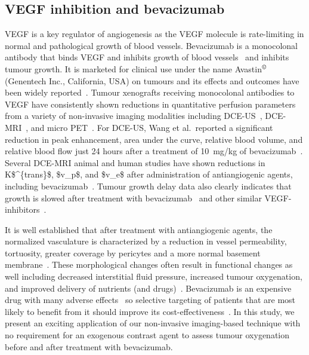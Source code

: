 \subsection{VEGF inhibition and bevacizumab}

\acs{VEGF} is a key regulator of angiogenesis as the \acs{VEGF} molecule is rate-limiting in normal and pathological growth of blood vessels.
Bevacizumab is a monocolonal antibody that binds \acs{VEGF} and inhibits growth of blood vessels~\cite{Ferrara:2004fa} and inhibits tumour growth.
It is marketed for clinical use under the name Avastin$^{\tiny{\textrm{\textcopyright}}}$ (Genentech Inc., California, USA) on tumours and its effects and outcomes have been widely reported~\cite{Keating:2014gt, Pavlidis:2013bj, Barnett:2013bt, Kumler:2014gb}.
Tumour xenografts receiving monocolonal antibodies to VEGF have consistently shown reductions in quantitative perfusion parameters from a variety of non-invasive imaging modalities including \acs{DCE-US}~\cite{Wang:2015bb}, \acs{DCE-MRI}~\cite{OConnor:2009cg}, and micro PET~\cite{Nagengast:2007hx}.
For \ac{DCE-US}, Wang et al.\ reported a significant reduction in peak enhancement, area under the curve, relative blood volume, and relative blood flow just 24 hours after a treatment of 10~mg/kg of bevacizumab~\cite{Wang:2015bb}.  
Several \ac{DCE-MRI} animal and human studies have shown reductions in \acs{K$^{trans}$}, \acs{$v_p$}, and \acs{$v_e$} after administration of antiangiogenic agents, including bevacizumab~\cite{Yang:2018hz}.
Tumour growth delay data also clearly indicates that growth is slowed after treatment with bevacizumab~\cite{Yang:2018hz} and other similar \acs{VEGF}-inhibitors~\cite{OConnor:2012ie}.

It is well established that after treatment with antiangiogenic agents, the normalized vasculature is characterized by a reduction in vessel permeability, tortuosity, greater coverage by pericytes and a more normal basement membrane~\cite{Jain:2005gk}. 
These morphological changes often result in functional changes as well including decreased interstitial fluid pressure, increased tumour oxygenation, and improved delivery of nutrients (and drugs)~\cite{Jain:2005gk}.
Bevacizumab is an expensive drug with many adverse effects~\cite{Keating:2014gt} so selective targeting of patients that are most likely to benefit from it should improve its cost-effectiveness~\cite{Barnett:2013bt}.
In this study, we present an exciting application of our non-invasive imaging-based technique with no requirement for an exogenous contrast agent to assess tumour oxygenation before and after treatment with bevacizumab.

